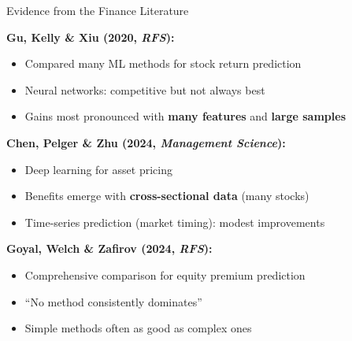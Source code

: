 \documentclass[10pt]{beamer}
\newcommand{\highlight}[1]{\textcolor{AccentOrange}{\textbf{#1}}}
\begin{document}
\begin{frame}{Evidence from the Finance Literature}

  \textbf{Gu, Kelly \& Xiu (2020, \textit{RFS}):}
  \begin{itemize}
    \item Compared many ML methods for stock return prediction
    \item Neural networks: competitive but not always best
    \item Gains most pronounced with \highlight{many features} and \highlight{large samples}
  \end{itemize}

  \vspace{0.5em}
  \textbf{Chen, Pelger \& Zhu (2024, \textit{Management Science}):}
  \begin{itemize}
    \item Deep learning for asset pricing
    \item Benefits emerge with \highlight{cross-sectional data} (many stocks)
    \item Time-series prediction (market timing): modest improvements
  \end{itemize}

  \vspace{0.5em}
  \textbf{Goyal, Welch \& Zafirov (2024, \textit{RFS}):}
  \begin{itemize}
    \item Comprehensive comparison for equity premium prediction
    \item ``No method consistently dominates''
    \item Simple methods often as good as complex ones
  \end{itemize}
\end{frame}

\end{document}
